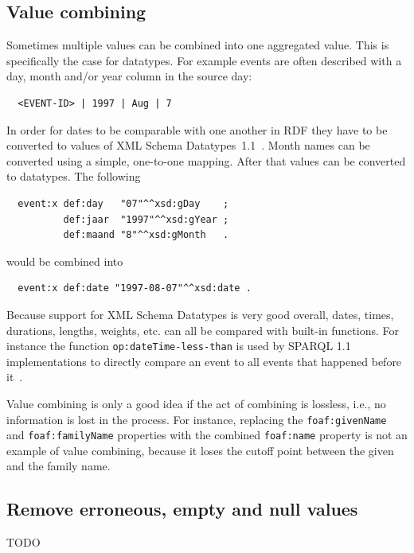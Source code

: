 \documentclass[a4paper]{scrartcl}
\newcommand{\textt}[1]{{\small \texttt{#1}}}
\begin{document}
\subsection{Value combining}
\label{sec:value_combining}

Sometimes multiple values can be combined into one aggregated value.
This is specifically the case for datatypes.  For example events are
often described with a day, month and/or year column in the source
day:

\begin{verbatim}
  <EVENT-ID> | 1997 | Aug | 7
\end{verbatim}

In order for dates to be comparable with one another in RDF they have
to be converted to values of XML Schema
Datatypes~1.1~\cite{Peterson2012}.  Month names can be converted using
a simple, one-to-one mapping.  After that values can be converted
to datatypes.  The following

\begin{verbatim}
  event:x def:day   "07"^^xsd:gDay    ;
          def:jaar  "1997"^^xsd:gYear ;
          def:maand "8"^^xsd:gMonth   .
\end{verbatim}

would be combined into

\begin{verbatim}
  event:x def:date "1997-08-07"^^xsd:date .
\end{verbatim}

Because support for XML Schema Datatypes is very good overall, dates,
times, durations, lengths, weights, etc. can all be compared with
built-in functions.  For instance the function
\textt{op:dateTime-less-than} is used by SPARQL 1.1 implementations to
directly compare an event to all events that happened before
it~\cite{Malhotra2015}.

Value combining is only a good idea if the act of combining is
lossless, i.e., no information is lost in the process.  For instance,
replacing the \textt{foaf:givenName} and \textt{foaf:familyName}
properties with the combined \textt{foaf:name} property is not an
example of value combining, because it loses the cutoff point between
the given and the family name.


\subsection{Remove erroneous, empty and null values}

TODO
\end{document}
